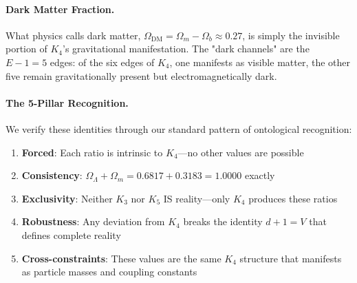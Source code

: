 \documentclass[11pt,a4paper]{book}
\begin{document}
\paragraph{Dark Matter Fraction.}
What physics calls dark matter, $\Omega_{\text{DM}} = \Omega_m - \Omega_b \approx 0.27$, is simply the invisible portion of $K_4$'s gravitational manifestation.
The "dark channels" are the $E - 1 = 5$ edges: of the six edges of $K_4$, one manifests as
visible matter, the other five remain gravitationally present but electromagnetically dark.

\paragraph{The 5-Pillar Recognition.}
We verify these identities through our standard pattern of ontological recognition:
\begin{enumerate}
\item \textbf{Forced}: Each ratio is intrinsic to $K_4$—no other values are possible
\item \textbf{Consistency}: $\Omega_\Lambda + \Omega_m = 0.6817 + 0.3183 = 1.0000$ exactly
\item \textbf{Exclusivity}: Neither $K_3$ nor $K_5$ IS reality—only $K_4$ produces these ratios
\item \textbf{Robustness}: Any deviation from $K_4$ breaks the identity $d + 1 = V$ that defines complete reality
\item \textbf{Cross-constraints}: These values are the same $K_4$ structure that manifests as particle masses and coupling constants
\end{enumerate}
\end{document}
